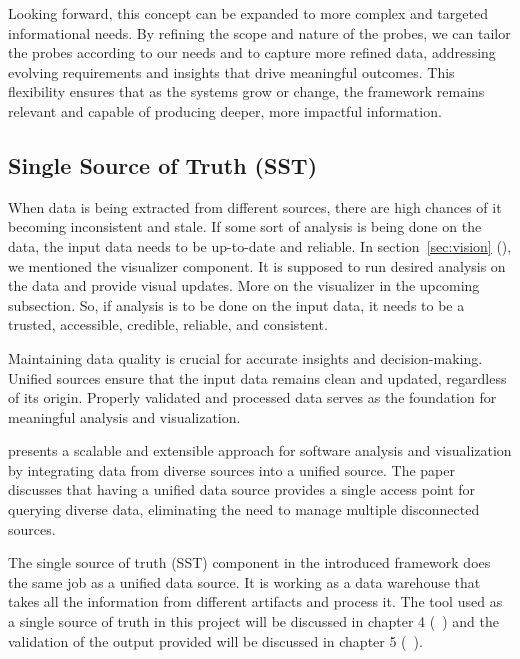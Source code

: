 Looking forward, this concept can be expanded to more complex and targeted informational needs. By refining the scope and nature of the probes, we can tailor the probes according to our needs and to capture more refined data, addressing evolving requirements and insights that drive meaningful outcomes. This flexibility ensures that as the systems grow or change, the framework remains relevant and capable of producing deeper, more impactful information.


\subsection{Single Source of Truth (SST)}\label{sec:component-sst}

When data is being extracted from different sources, there are high chances of it becoming inconsistent and stale. If some sort of analysis is being done on the data, the input data needs to be up-to-date and reliable. In section~\ref{sec:vision} (), we mentioned the visualizer component. It is supposed to run desired analysis on the data and provide visual updates. More on the visualizer in the upcoming subsection. So, if analysis is to be done on the input data, it needs to be a trusted, accessible, credible, reliable, and consistent.

Maintaining data quality is crucial for accurate insights and decision-making. Unified sources ensure that the input data remains clean and updated, regardless of its origin. Properly validated and processed data serves as the foundation for meaningful analysis and visualization.

\citep{MullerUdsforSA2018} presents a scalable and extensible approach for software analysis and visualization by integrating data from diverse sources into a unified source. The paper discusses that having a unified data source provides a single access point for querying diverse data, eliminating the need to manage multiple disconnected sources. 

The single source of truth (SST) component in the introduced framework does the same job as a unified data source. It is working as a data warehouse that takes all the information from different artifacts and process it. The tool used as a single source of truth in this project will be discussed in chapter 4 (~) and the validation of the output provided will be discussed in chapter 5 (~).

